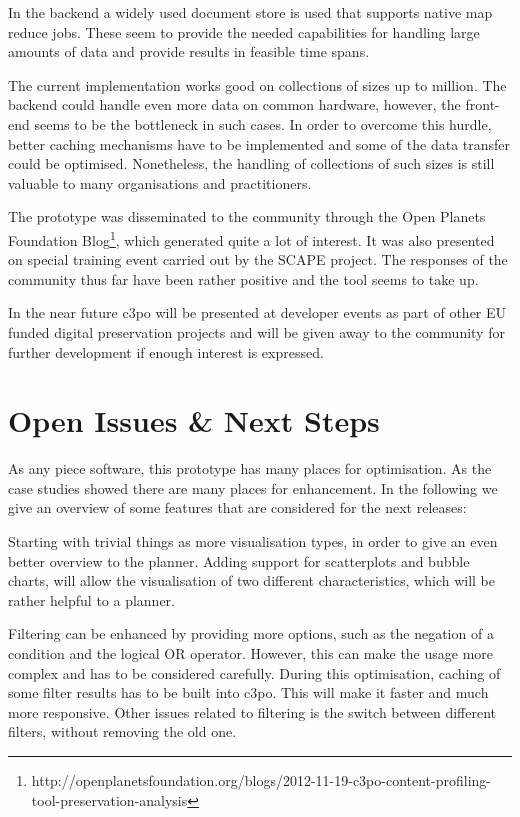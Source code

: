 In the backend a widely used document store is used that supports native map reduce jobs. These seem to provide the needed capabilities for handling large amounts of data and provide results in feasible time spans.

The current implementation works good on collections of sizes up to million. The backend could handle even more data on common hardware, however, the front-end seems to be the bottleneck in such cases. In order to overcome this hurdle, better caching mechanisms have to be implemented and some of the data transfer could be optimised.
Nonetheless, the handling of collections of such sizes is still valuable to many organisations and practitioners.

The prototype was disseminated to the community through the Open Planets Foundation Blog\footnote{http://openplanetsfoundation.org/blogs/2012-11-19-c3po-content-profiling-tool-preservation-analysis}, which generated quite a lot of interest. It was also presented on special training event carried out by the SCAPE project. The responses of the community thus far have been rather positive and the tool seems to take up.  

In the near future c3po will be presented at developer events as part of other EU funded digital preservation projects and will be given away to the community for further development if enough interest is expressed.

% 

\section{Open Issues \& Next Steps}

As any piece software, this prototype has many places for optimisation. As the case studies showed there are many places for enhancement. In the following we give an overview of some features that are considered for the next releases:

Starting with trivial things as more visualisation types, in order to give an even better overview to the planner. Adding support for scatterplots and bubble charts, will allow the visualisation of two different characteristics, which will be rather helpful to a planner.

Filtering can be enhanced by providing more options, such as the negation of a condition and the logical OR operator. However, this can make the usage more complex and has to be considered carefully. During this optimisation, caching of some filter results has to be built into c3po. This will make it faster and much more responsive.
Other issues related to filtering is the switch between different filters, without removing the old one.

